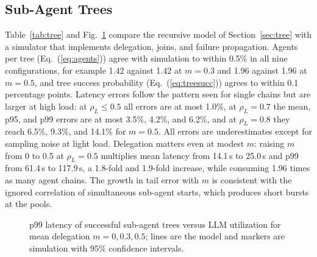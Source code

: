 \documentclass[journal]{IEEEtran}
\begin{document}
\subsection{Sub-Agent Trees}
Table~\ref{tab:tree} and Fig.~\ref{fig:treeplot} compare the recursive model of Section~\ref{sec:tree} with a simulator that implements delegation, joins, and failure propagation. Agents per tree (Eq.~(\ref{eq:agents})) agree with simulation to within 0.5\% in all nine configurations, for example 1.42 against 1.42 at $m=0.3$ and 1.96 against 1.96 at $m=0.5$, and tree success probability (Eq.~(\ref{eq:treesucc})) agrees to within 0.1 percentage points. Latency errors follow the pattern seen for single chains but are larger at high load: at $\rho_L\le0.5$ all errors are at most 1.0\%, at $\rho_L=0.7$ the mean, p95, and p99 errors are at most 3.5\%, 4.2\%, and 6.2\%, and at $\rho_L=0.8$ they reach 6.5\%, 9.3\%, and 14.1\% for $m=0.5$. All errors are underestimates except for sampling noise at light load. Delegation matters even at modest $m$: raising $m$ from 0 to 0.5 at $\rho_L=0.5$ multiplies mean latency from 14.1\,s to 25.0\,s and p99 from 61.4\,s to 117.9\,s, a 1.8-fold and 1.9-fold increase, while consuming 1.96 times as many agent chains. The growth in tail error with $m$ is consistent with the ignored correlation of simultaneous sub-agent starts, which produces short bursts at the pools.
\begin{figure}[t]
\centering
{}
\caption{p99 latency of successful sub-agent trees versus LLM utilization for mean delegation $m=0,0.3,0.5$; lines are the model and markers are simulation with 95\% confidence intervals.}
\label{fig:treeplot}
\end{figure}
\end{document}
